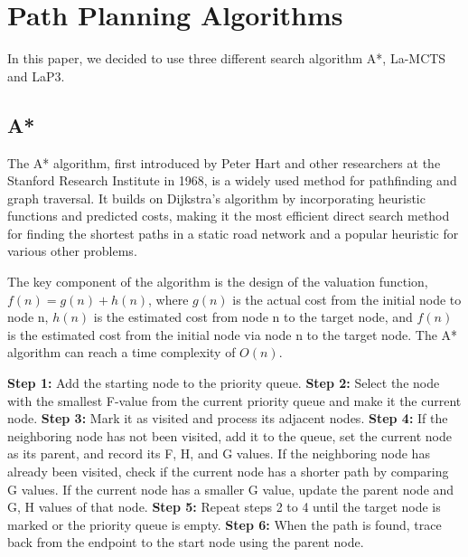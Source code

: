 \documentclass[bibliography=totoc]{scrartcl}
\begin{document}
\newpage
\section{Path Planning Algorithms}
\label{path_planning_algorithm}
In this paper, we decided to use three different search algorithm A*, \ac{La-MCTS} and \ac{LaP3}.

\subsection{A*}

The A* algorithm, first introduced by Peter Hart and other researchers at the Stanford Research Institute in 1968, is a widely used method for pathfinding and graph traversal. \cite{4082128} It builds on Dijkstra's algorithm by incorporating heuristic functions and predicted costs, making it the most efficient direct search method for finding the shortest paths in a static road network and a popular heuristic for various other problems.\cite{ProbabilisticApproachCollaborativeMultiRobotLocalization}

The key component of the algorithm is the design of the valuation function, $f(n) = g(n) + h(n)$, where $g(n)$ is the actual cost from the initial node to node n, $h(n)$ is the estimated cost from node n to the target node, and $f(n)$ is the estimated cost from the initial node via node n to the target node. The A* algorithm can reach a time complexity of $O(n)$.

\textbf{Step 1:} Add the starting node to the priority queue.
\newline
\textbf{Step 2:} Select the node with the smallest F-value from the current priority queue and make it the current node.
\newline
\textbf{Step 3:} Mark it as visited and process its adjacent nodes.
\newline
\textbf{Step 4:} If the neighboring node has not been visited, add it to the queue, set the current node as its parent, and record its F, H, and G values. If the neighboring node has already been visited, check if the current node has a shorter path by comparing G values. If the current node has a smaller G value, update the parent node and G, H values of that node.
\newline
\textbf{Step 5:} Repeat steps 2 to 4 until the target node is marked or the priority queue is empty.
\newline
\textbf{Step 6:} When the path is found, trace back from the endpoint to the start node using the parent node.
\end{document}
